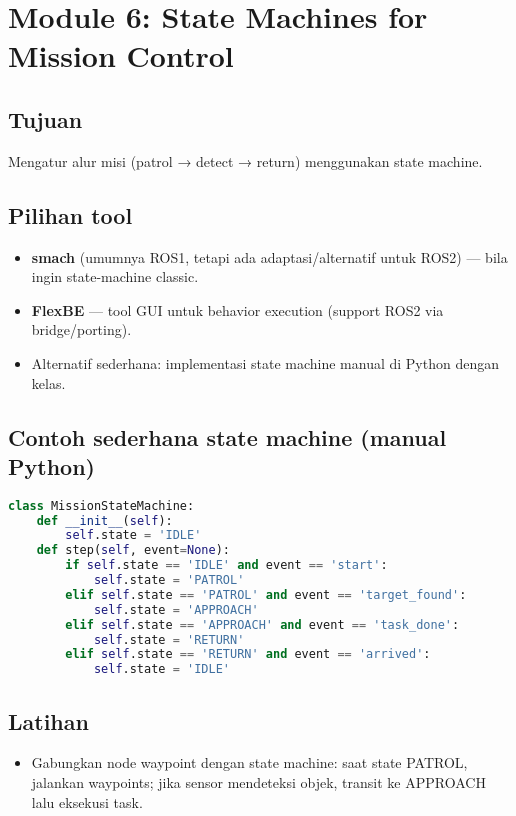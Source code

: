 \documentclass[12pt,a4paper]{article}
\begin{document}
\newpage
\section{Module 6: State Machines for Mission Control}
\subsection*{Tujuan}
Mengatur alur misi (patrol → detect → return) menggunakan state machine.

\subsection*{Pilihan tool}
\begin{itemize}
    \item \textbf{smach} (umumnya ROS1, tetapi ada adaptasi/alternatif untuk ROS2) — bila ingin state-machine classic.
    \item \textbf{FlexBE} — tool GUI untuk behavior execution (support ROS2 via bridge/porting).
    \item Alternatif sederhana: implementasi state machine manual di Python dengan kelas.
\end{itemize}

\subsection*{Contoh sederhana state machine (manual Python)}
\begin{lstlisting}[language=python]
class MissionStateMachine:
    def __init__(self):
        self.state = 'IDLE'
    def step(self, event=None):
        if self.state == 'IDLE' and event == 'start':
            self.state = 'PATROL'
        elif self.state == 'PATROL' and event == 'target_found':
            self.state = 'APPROACH'
        elif self.state == 'APPROACH' and event == 'task_done':
            self.state = 'RETURN'
        elif self.state == 'RETURN' and event == 'arrived':
            self.state = 'IDLE'
\end{lstlisting}

\subsection*{Latihan}
\begin{itemize}
    \item Gabungkan node waypoint dengan state machine: saat state PATROL, jalankan waypoints; jika sensor mendeteksi objek, transit ke APPROACH lalu eksekusi task.
\end{itemize}
\end{document}
